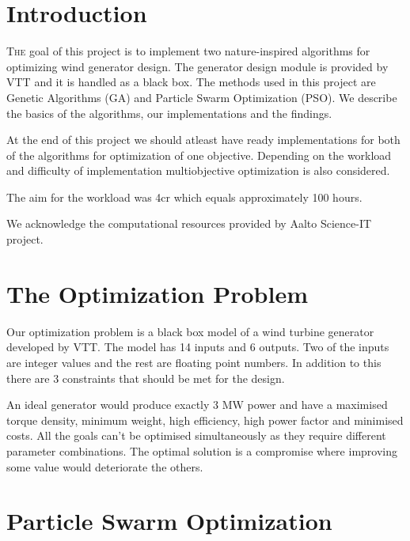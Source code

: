 \documentclass[twoside]{article}
\begin{document}
\begin{multicols}{2} %

\section{Introduction}

\lettrine[nindent=0em,lines=3]{T}{he} goal of this project is to implement two nature-inspired algorithms for optimizing wind generator design. The generator design module is provided by VTT and it is handled as a black box. The methods used in this project are Genetic Algorithms (GA) and Particle Swarm Optimization (PSO). We describe the basics of the algorithms, our implementations and the findings.


At the end of this project we should atleast have ready implementations for both of the algorithms for optimization of one objective. Depending on the workload and difficulty of implementation multiobjective optimization is also considered.

The aim for the workload was 4cr which equals approximately 100 hours.

We acknowledge the computational resources provided by Aalto Science-IT project.


\section{The Optimization Problem}
Our optimization problem is a black box model of a wind turbine generator developed by VTT. The model has 14 inputs and 6 outputs. Two of the inputs are integer values and the rest are floating point numbers. In addition to this there are 3 constraints that should be met for the design. 

An ideal generator would produce exactly 3 MW power and have a maximised torque density, minimum weight, high efficiency, high power factor and minimised costs. All the goals can't be optimised simultaneously as they require different parameter combinations. The optimal solution is a compromise where improving some value would deteriorate the others.


\section{Particle Swarm Optimization}


\end{multicols}
\end{document}
